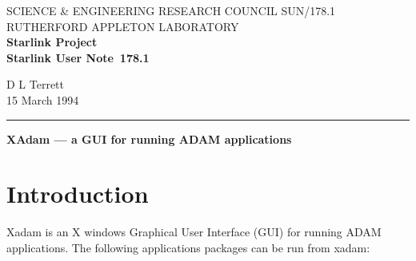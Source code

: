 \pagestyle{myheadings}

\newcommand{\stardoccategory}  {Starlink User Note}
\newcommand{\stardocinitials}  {SUN}
\newcommand{\stardocnumber}    {178.1}
\newcommand{\stardocauthors}   {D L Terrett}
\newcommand{\stardocdate}      {15 March 1994}
\newcommand{\stardoctitle}     {XAdam --- a GUI for running ADAM applications}

\newcommand{\stardocname}{\stardocinitials /\stardocnumber}
\renewcommand{\_}{{\tt\char'137}}     %
\markright{\stardocname}
\setlength{\textwidth}{160mm}
\setlength{\textheight}{230mm}
\setlength{\topmargin}{-2mm}
\setlength{\oddsidemargin}{0mm}
\setlength{\evensidemargin}{0mm}
\setlength{\parindent}{0mm}
\setlength{\parskip}{\medskipamount}
\setlength{\unitlength}{1mm}



\thispagestyle{empty}
SCIENCE \& ENGINEERING RESEARCH COUNCIL \hfill \stardocname\\
RUTHERFORD APPLETON LABORATORY\\
{\large\bf Starlink Project\\}
{\large\bf \stardoccategory\ \stardocnumber}
\begin{flushright}
\stardocauthors\\
\stardocdate
\end{flushright}
\vspace{-4mm}
\rule{\textwidth}{0.5mm}
\vspace{5mm}
\begin{center}
{\Large\bf \stardoctitle}
\end{center}
\vspace{5mm}


\section{Introduction}
Xadam is an X windows Graphical User Interface (GUI) for running ADAM 
applications. The following applications packages can be run from xadam:

